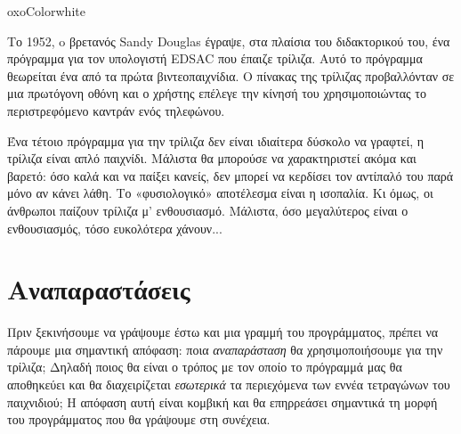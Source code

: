\documentclass[a4paper,11pt,oneside]{book}
\begin{document}
\bonustrue

{oxoColor}{white}


Το 1952, o βρετανός Sandy Douglas έγραψε, στα πλαίσια του διδακτορικού του, ένα πρόγραμμα για τον υπολογιστή EDSAC που έπαιζε τρίλιζα. Αυτό το πρόγραμμα θεωρείται ένα από τα πρώτα βιντεοπαιχνίδια. 
Ο πίνακας της τρίλιζας προβαλλόνταν σε μια πρωτόγονη οθόνη και ο χρήστης επέλεγε την κίνησή του χρησιμοποιώντας το περιστρεφόμενο καντράν ενός τηλεφώνου. 

Ένα τέτοιο πρόγραμμα για την τρίλιζα δεν είναι ιδιαίτερα δύσκολο να γραφτεί, η τρίλιζα είναι απλό παιχνίδι. Μάλιστα θα μπορούσε να χαρακτηριστεί ακόμα και βαρετό: όσο καλά και να παίξει κανείς, δεν μπορεί να κερδίσει τον αντίπαλό του παρά μόνο αν κάνει λάθη. Το «φυσιολογικό» αποτέλεσμα είναι η ισοπαλία. Κι  όμως, οι άνθρωποι παίζουν τρίλιζα μ' ενθουσιασμό. Μάλιστα, όσο μεγαλύτερος είναι ο ενθουσιασμός, τόσο ευκολότερα χάνουν...


\section{Αναπαραστάσεις}

Πριν ξεκινήσουμε να γράψουμε έστω και μια γραμμή του προγράμματος, πρέπει να πάρουμε μια σημαντική απόφαση: ποια \emph{αναπαράσταση} θα χρησιμοποιήσουμε για την τρίλιζα; Δηλαδή ποιος θα είναι ο τρόπος με τον οποίο το πρόγραμμά μας θα αποθηκεύει και θα διαχειρίζεται \emph{εσωτερικά} τα περιεχόμενα των εννέα τετραγώνων του παιχνιδιού; Η απόφαση αυτή είναι κομβική και θα επηρρεάσει σημαντικά τη μορφή του προγράμματος που θα γράψουμε στη συνέχεια.
\end{document}
